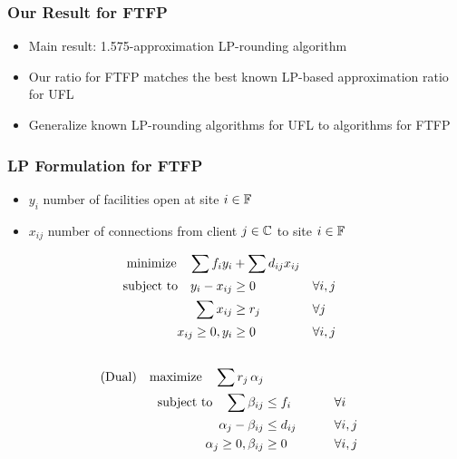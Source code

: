 \documentclass[handout, hyperref, xcolor=dvipsnames]{beamer}
\begin{document}
\begin{frame}
  \frametitle{Our Result for FTFP}

  \begin{itemize}
  \item Main result: 1.575-approximation LP-rounding algorithm
  \item Our ratio for FTFP matches the best known LP-based
    approximation ratio for UFL
  \item Generalize known LP-rounding algorithms for UFL to algorithms for FTFP
  \end{itemize}
\end{frame}


\begin{frame}
  \frametitle{LP Formulation for FTFP}
  \begin{itemize}
  \item $y_i$   number of facilities open at site $i\in \mathbb{F}$
  \item $x_{ij}$ number of connections from client $j\in
    \mathbb{C}$ to site $i \in \mathbb{F}$
  \end{itemize}
  \begin{alignat}{3}
    \textrm{minimize}\quad \sum f_iy_i &+ \sum d_{ij}x_{ij}&
    \\ \notag
    \textrm{subject to}\quad y_i - x_{ij} &\geq 0  & &\forall i,j
    \\ \notag
    \sum x_{ij} &\geq r_j & &\forall j
    \\ \notag
    x_{ij} \geq 0, y_i &\geq 0 & &\forall i,j
    \\ \notag
  \end{alignat}
  \begin{alignat}{3}
  \text{(Dual)}\quad  \textrm{maximize}\quad \sum r_j\, \alpha_j&
    \\ \notag
    \textrm{subject to} \quad 
      \sum \beta_{ij} &\leq f_i  &\quad\quad			&\forall i
    \\ \notag
    \alpha_{j} - \beta_{ij} 	&\leq  d_{ij}       &                 & \forall i,j
    \\ \notag
    \alpha_j \geq 0, \beta_{ij} &\geq 0           &            & \forall i,j
  \end{alignat}
\end{frame}
\end{document}
